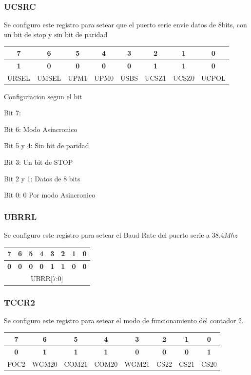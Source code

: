 \documentclass[10pt,spanish,a4paper,openany,notitlepage]{article}
\begin{document}
\subsubsection{UCSRC}\label{UCSRC}
Se configuro este registro para setear que el puerto serie envie datos de 8bits, con un bit de stop y sin bit de paridad
\begin{center}
\begin{tabular}{|c|c|c|c|c|c|c|c|}\hline
7&6&5&4&3&2&1&0\\\hline
\textbf{1}&\textbf{0}&\textbf{0}&\textbf{0}&\textbf{0}&\textbf{1}&\textbf{1}&\textbf{0}\\\hline
URSEL&UMSEL&UPM1&UPM0&USBS&UCSZ1&UCSZ0&UCPOL\\\hline
\end{tabular}
\end{center}

\begin{description}
\item{Configuracion segun el bit}
\item{Bit 7}:
\item{Bit 6}: Modo Asincronico
\item{Bit 5 y 4}: Sin bit de paridad
\item{Bit 3}: Un bit de STOP
\item{Bit 2 y 1}: Datos de 8 bits
\item{Bit 0}: 0 Por modo Asincronico
\end{description}

\subsubsection{UBRRL}
Se configuro este registro para setear el Baud Rate del puerto serie a $38.4Mhz$
\begin{center}
\begin{tabular}{|c|c|c|c|c|c|c|c|}\hline
7&6&5&4&3&2&1&0\\\hline
\textbf{0}&\textbf{0}&\textbf{0}&\textbf{0}&\textbf{1}&\textbf{1}&\textbf{0}&\textbf{0}\\\hline
\multicolumn{8}{|c|}{UBRR[7:0]}\\\hline
\end{tabular}
\end{center}

\subsubsection{TCCR2}\label{TCCR2}
Se configuro este registro para setear el modo de funcionamiento del contador 2. 
\begin{center}
\begin{tabular}{|c|c|c|c|c|c|c|c|}\hline
7&6&5&4&3&2&1&0\\\hline
\textbf{0}&\textbf{1}&\textbf{1}&\textbf{1}&\textbf{0}&\textbf{0}&\textbf{0}&\textbf{1}\\\hline
FOC2&WGM20&COM21&COM20&WGM21&CS22&CS21&CS20\\\hline
\end{tabular}
\end{center}
\end{document}
